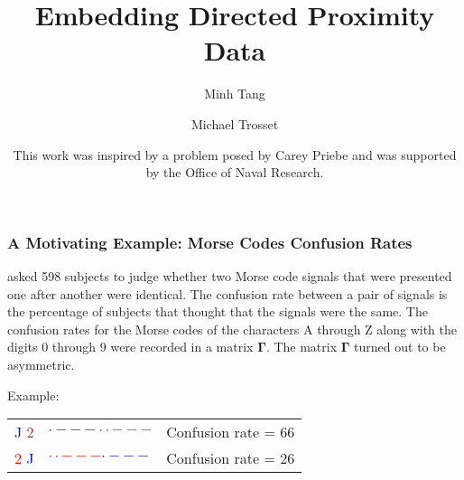 \documentclass[professionalfonts,hyperref={pdfpagelabels=false,colorlinks=true,linkcolor=cyan}]{beamer}
\begin{document}
\title[Embedding Directed Proximity Data]{Embedding Directed Proximity Data}
\author[Tang \& Trosset]{Minh Tang \and Michael
  Trosset}
\date[JSM 2010]{This work was inspired by a problem posed by Carey
  Priebe and was supported by the Office of Naval Research.}

\begin{frame}
\titlepage
\end{frame}

\begin{frame}
  \frametitle{A Motivating Example: Morse Codes Confusion Rates}
  \cite{rothkopf57} asked 598 subjects to judge whether two Morse code
  signals that were presented one after another were identical. The
  confusion rate between a pair of signals is the percentage of
  subjects that thought that the signals were the same.  The confusion
  rates for the Morse codes of the characters A through Z along with
  the digits 0 through 9 were recorded in a matrix
  $\bm{\Gamma}$. The matrix $\bm{\Gamma}$ turned out to be
  asymmetric. 

  \vskip10pt Example:
  \vskip10pt
  \begin{tabular}{ccc}
  \textcolor{blue}{J} \textcolor{red}{2} & \textcolor{blue}{$
    \cdot - - -$}\textcolor{red}{$\cdot \cdot - - -$} & Confusion rate
  = 66 \\
  \textcolor{red}{2} \textcolor{blue}{J} & \textcolor{red}{$
    \cdot \cdot - - -$}\textcolor{blue}{$\cdot - - -$} & Confusion
  rate = 26
  \end{tabular}
\end{frame}
\end{document}

